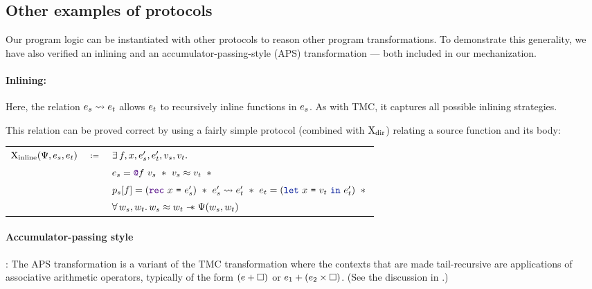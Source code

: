 \subsection{Other examples of protocols}

Our program logic can be instantiated with other protocols to reason other program transformations.
To demonstrate this generality, we have also verified an inlining and an accumulator-passing-style (APS) transformation --- both included in our mechanization.

\paragraph{Inlining:} Here, the relation $\datalangExpr_s \rightsquigarrow \datalangExpr_t$ allows $\datalangExpr_t$ to recursively inline functions in $\datalangExpr_s$.
As with TMC, it captures all possible inlining strategies.

This relation can be proved correct by using a fairly simple protocol (combined with $\mathrm{X}_\mathrm{dir}$) relating a source function and its body:

\begin{tabular}{rcl}
        $\iProt_\mathrm{inline} (\iPredTwo, \datalangExpr_s, \datalangExpr_t)$
        & $\coloneqq$ &
        $\exists \datalangFn, \datalangVar, \datalangExpr_s', \datalangExpr_t', \datalangVal_s, \datalangVal_t \ldotp$
    \\
        &&
        $
        \datalangExpr_s = \datalangCall{\datalangFnptr{\datalangFn}}{\datalangVal_s}
        \ \iSep\ %
        \datalangVal_s \iSimilar \datalangVal_t
        \ \iSep {}$
    \\
        &&
        $\datalangProg_s [\datalangFn] = (\datalangRec{\datalangVar}{\datalangExpr_s'})
        \ \iSep\ %
        \datalangExpr_s' \rightsquigarrow \datalangExpr_t'
        \ \iSep\ %
        \datalangExpr_t = (\datalangLet{\datalangVar}{\datalangVal_t}{\datalangExpr_t'})
        \ \iSep {}$
    \\
        &&
        $\forall \datalangValTwo_s, \datalangValTwo_t \ldotp
        \datalangValTwo_s \iSimilar \datalangValTwo_t \iWand
        \iPredTwo (\datalangValTwo_s, \datalangValTwo_t)$
\end{tabular}
\medskip

\paragraph{Accumulator-passing style}: The APS transformation is a variant of the TMC transformation where the contexts that are made tail-recursive are applications of associative arithmetic operators, typically of the form $(\datalangExpr + \datalangCtxHole)$ or $\datalangExpr_1 + (\datalangExpr_2 \times \datalangCtxHole)$. (See the discussion in \citet*{tmc-koka-2023}.)

